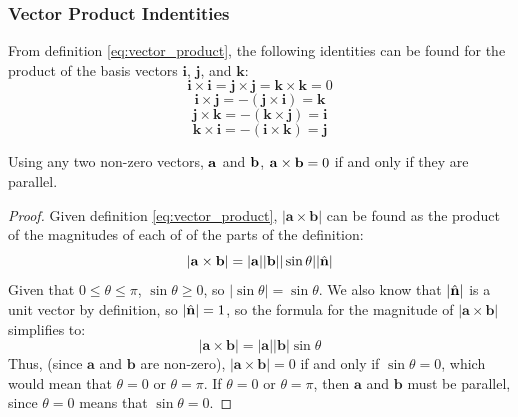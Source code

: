         \subsubsection{Vector Product Indentities}
        From definition \ref{eq:vector_product}, the following identities can be found for the product of the basis vectors $\mathbf{i}$, $\mathbf{j}$, and $\mathbf{k}$:
        \begin{equation} \label{eq:vector_product_of_ii_jj_kk}
            \mathbf{i}\times\mathbf{i}=\mathbf{j}\times\mathbf{j}=\mathbf{k}\times\mathbf{k}=0
        \end{equation}
        \begin{equation} \label{eq:vector_product_of_ij}
            \mathbf{i}\times\mathbf{j}=-(\mathbf{j}\times\mathbf{i})=\mathbf{k}
        \end{equation}
        \begin{equation} \label{eq:vector_product_of_jk}
            \mathbf{j}\times\mathbf{k}=-(\mathbf{k}\times\mathbf{j})=\mathbf{i}
        \end{equation}
        \begin{equation} \label{eq:vector_product_of_ki}
            \mathbf{k}\times\mathbf{i}=-(\mathbf{i}\times\mathbf{k})=\mathbf{j}
        \end{equation}

        \begin{theorem}
            Using any two non-zero vectors, $\normalfont\mathbf{a}$ and $\normalfont\mathbf{b}$, $\normalfont\mathbf{a}\times\mathbf{b}=0$ if and only if they are parallel.
        \end{theorem}
        \begin{proof}
            Given definition \ref{eq:vector_product}, $|\mathbf{a}\times\mathbf{b}|$ can be found as the product of the magnitudes of each of of the parts of the definition:
            \begin{equation}
                |\mathbf{a}\times\mathbf{b}|=|\mathbf{a}||\mathbf{b}||\sin\theta||\hat{\mathbf{n}}|
            \end{equation}
            Given that $0\le\theta\le\pi$, $\sin\theta\ge0$, so $|\sin\theta|=\sin\theta$.
            We also know that $|\hat{\mathbf{n}}|$ is a unit vector by definition, so $|\hat{\mathbf{n}}|=1$, so the formula for the magnitude of $|\mathbf{a}\times\mathbf{b}|$ simplifies to:
            \begin{equation}
                |\mathbf{a}\times\mathbf{b}|=|\mathbf{a}||\mathbf{b}|\sin\theta
            \end{equation}
            Thus, (since $\mathbf{a}$ and $\mathbf{b}$ are non-zero), $|\mathbf{a}\times\mathbf{b}|=0$ if and only if $\sin\theta=0$, which would mean that $\theta=0$ or $\theta=\pi$.
            If $\theta=0$ or $\theta=\pi$, then $\mathbf{a}$ and $\mathbf{b}$ must be parallel, since $\theta=0$ means that $\sin\theta=0$.
        \end{proof}

